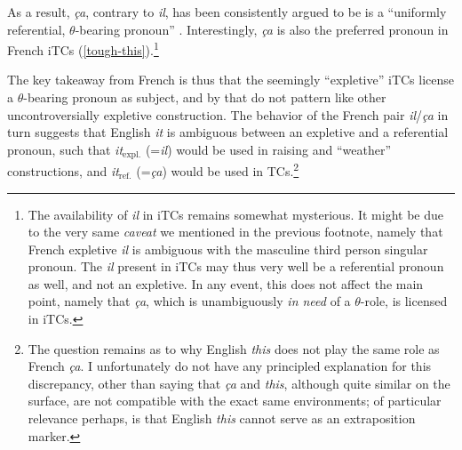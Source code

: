\documentclass[11pt]{article}
\begin{document}
As a result, \textit{ça}, contrary to \textit{il}, has been consistently argued to be is a ``uniformly referential, $\theta$-bearing pronoun'' \cite{Kayne1983,Pollock1983,Jaeggli1981,Zaring1994}. Interestingly, \textit{ça} is also the preferred pronoun in French iTCs (\ref{tough-this}).\footnote{The availability of \textit{il} in iTCs remains somewhat mysterious. It might be due to the very same \textit{caveat} we mentioned in the previous footnote, namely that French expletive \textit{il} is ambiguous with the masculine third person singular pronoun. The \textit{il} present in iTCs may thus very well be a referential pronoun as well, and not an expletive. In any event, this does not affect the main point, namely that \textit{ça}, which is unambiguously \textit{in need} of a $\theta$-role, is licensed in iTCs.}
\begin{exe}
	\ex
	\normalsize
	\begin{xlist}
		\label{tough-it}
		\label{tough-this}
	\end{xlist}
\end{exe}

The key takeaway from French is thus that the seemingly ``expletive'' iTCs license a $\theta$-bearing pronoun as subject, and by that do not pattern like other uncontroversially expletive construction. The behavior of the French pair \textit{il}/\textit{ça} in turn suggests that English \textit{it} is ambiguous between an expletive and a referential pronoun, such that \textit{it}$_{\text{expl.}}$ (=\textit{il}) would be used in raising and ``weather'' constructions, and \textit{it}$_{\text{ref.}}$ (=\textit{ça}) would be used in TCs.\footnote{The question remains as to why English \textit{this} does not play the same role as French \textit{ça}. I unfortunately do not have any principled explanation for this discrepancy, other than saying that \textit{ça} and \textit{this}, although quite similar on the surface, are not compatible with the exact same environments; of particular relevance perhaps, is that English \textit{this} cannot serve as an extraposition marker.}
\end{document}
